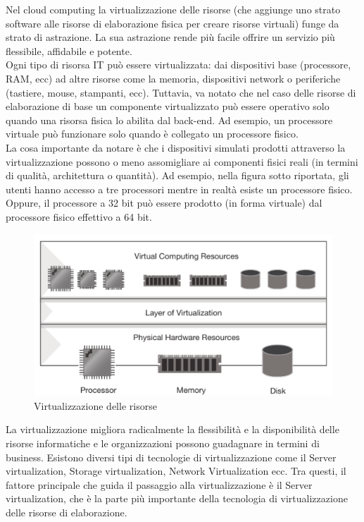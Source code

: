 \documentclass{article}
\begin{document}
Nel cloud computing la virtualizzazione delle risorse (che aggiunge uno strato software alle risorse di elaborazione fisica per creare risorse virtuali) funge da strato di astrazione. La sua astrazione rende più facile offrire un servizio più flessibile, affidabile e potente. \\
Ogni tipo di risorsa IT può essere virtualizzata: dai dispositivi base (processore, RAM, ecc) ad altre risorse come la memoria, dispositivi network o periferiche (tastiere, mouse, stampanti, ecc). Tuttavia, va notato che nel caso delle risorse di elaborazione di base un componente virtualizzato può essere operativo solo quando una risorsa fisica lo abilita dal back-end. Ad esempio, un processore virtuale può funzionare solo quando è collegato un processore fisico. \\
La cosa importante da notare è che i dispositivi simulati prodotti attraverso la virtualizzazione possono o meno assomigliare ai componenti fisici reali (in termini di qualità, architettura o quantità). Ad esempio, nella figura sotto riportata, gli utenti hanno accesso a tre processori mentre in realtà esiste un processore fisico. Oppure, il processore a 32 bit può essere prodotto (in forma virtuale) dal processore fisico effettivo a 64 bit.
\begin{figure}[H]
    \centering
    \includegraphics[scale=0.5]{img/resource virtualization.png}
    \caption{Virtualizzazione delle risorse}
\end{figure}\noindent
La virtualizzazione migliora radicalmente la flessibilità e la disponibilità delle risorse informatiche e le organizzazioni possono guadagnare in termini di business. Esistono diversi tipi di tecnologie di virtualizzazione come il Server virtualization, Storage virtualization, Network Virtualization ecc. Tra questi, il fattore principale che guida il passaggio alla virtualizzazione è il Server virtualization, che è la parte più importante della tecnologia di virtualizzazione delle risorse di elaborazione. \\
\end{document}
